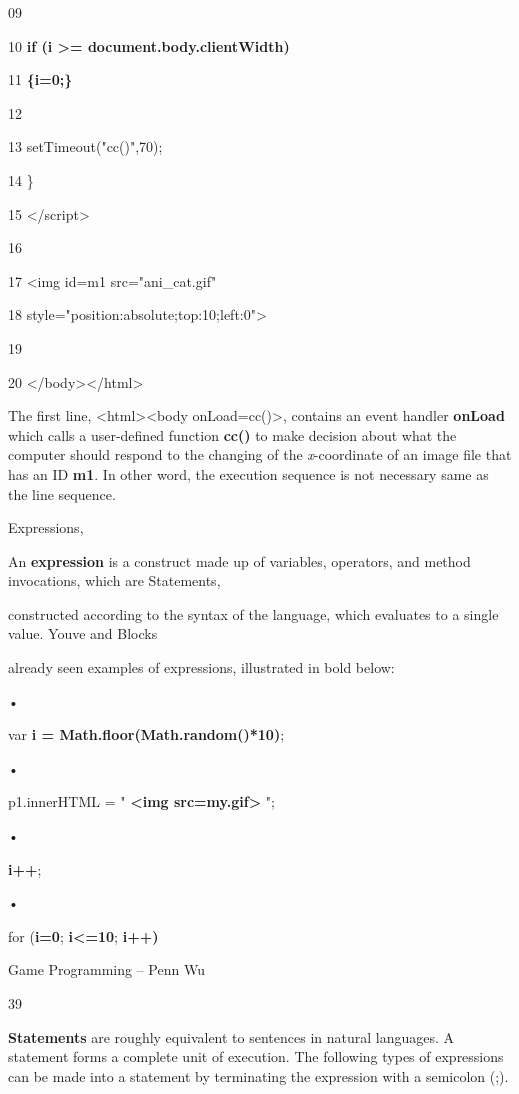 \documentclass[
]{article}
\begin{document}
09

10 \textbf{if (i \textgreater= document.body.clientWidth)}

\textbf{}

11 \textbf{\{i=0;\}}

12

13 setTimeout("cc()",70);

14 \}

15 \textless/script\textgreater{}

16

17 \textless img id=m1 src="ani\_cat.gif"

18 style="position:absolute;top:10;left:0"\textgreater{}

19

20 \textless/body\textgreater\textless/html\textgreater{}

The first line, \textless html\textgreater\textless body
onLoad=cc()\textgreater, contains an event handler \textbf{onLoad} which
calls a user-defined function \textbf{cc()} to make decision about what
the computer should respond to the changing of the \emph{x}-coordinate
of an image file that has an ID \textbf{m1}. In other word, the
execution sequence is not necessary same as the line sequence.

Expressions,

An \textbf{expression} is a construct made up of variables, operators,
and method invocations, which are Statements,

constructed according to the syntax of the language, which evaluates to
a single value. You\textquotesingle ve and Blocks

already seen examples of expressions, illustrated in bold below:

•

var \textbf{i = Math.floor(Math.random()*10)};

•

p1.innerHTML = " \textbf{\textless img
src=\textquotesingle my.gif\textquotesingle\textgreater{}} ";

•

\textbf{i++};

•

for (\textbf{i=0}; \textbf{i\textless=10}; \textbf{i++)}

Game Programming -- Penn Wu

39

\protect\hypertarget{index_split_004.htmlux5cux23p40}{}{}\textbf{Statements}
are roughly equivalent to sentences in natural languages. A statement
forms a complete unit of execution. The following types of expressions
can be made into a statement by terminating the expression with a
semicolon (;).
\end{document}
